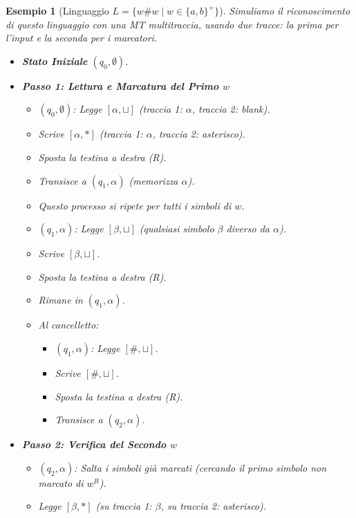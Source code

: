 \documentclass[a4paper, 11pt]{book} %
\newtheorem{example}[theorem]{Esempio}
\theoremstyle{definition}
\begin{document}
\begin{example}[Linguaggio $L = \{w\#w \mid w \in \{a,b\}^+\}$]
Simuliamo il riconoscimento di questo linguaggio con una MT multitraccia, usando due tracce: la prima per l'input e la seconda per i marcatori.
\begin{itemize}
    \item \textbf{Stato Iniziale} $(q_0, \emptyset)$.
    \item \textbf{Passo 1: Lettura e Marcatura del Primo $w$}
        \begin{itemize}
            \item $(q_0, \emptyset)$: Legge $[\alpha, \sqcup]$ (traccia 1: $\alpha$, traccia 2: blank).
            \item Scrive $[\alpha, *]$ (traccia 1: $\alpha$, traccia 2: asterisco).
            \item Sposta la testina a destra (R).
            \item Transisce a $(q_1, \alpha)$ (memorizza $\alpha$).
            \item Questo processo si ripete per tutti i simboli di $w$.
            \item $(q_1, \alpha)$: Legge $[\beta, \sqcup]$ (qualsiasi simbolo $\beta$ diverso da $\alpha$).
            \item Scrive $[\beta, \sqcup]$.
            \item Sposta la testina a destra (R).
            \item Rimane in $(q_1, \alpha)$.
            \item Al cancelletto:
                \begin{itemize}
                    \item $(q_1, \alpha)$: Legge $[\#, \sqcup]$.
                    \item Scrive $[\#, \sqcup]$.
                    \item Sposta la testina a destra (R).
                    \item Transisce a $(q_2, \alpha)$.
                \end{itemize}
        \end{itemize}
    \item \textbf{Passo 2: Verifica del Secondo $w$}
        \begin{itemize}
            \item $(q_2, \alpha)$: Salta i simboli già marcati (cercando il primo simbolo non marcato di $w^R$).
            \item Legge $[\beta, *]$ (su traccia 1: $\beta$, su traccia 2: asterisco).

\end{itemize}
\end{itemize}
\end{example}
\end{document}
